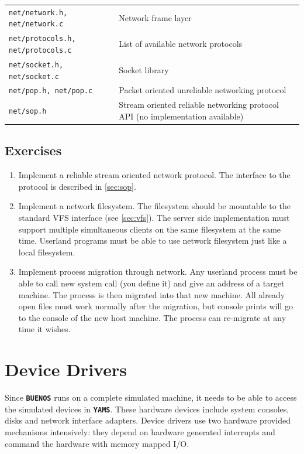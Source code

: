 \documentclass[twoside,a4paper]{report}
\newcommand{\PBS}[1]{\let\temp=\\#1\let\\=\temp}
\newlength{\tablewidth}
\newcommand{\buenos}{\texttt{\textbf{BUENOS}}}
\newcommand{\yams}{\texttt{\textbf{YAMS}}}
\newenvironment{filelist}[0]{%
\vspace{\baselineskip}%
\begin{center}%
\begin{tabular}{p{4cm}>{\PBS\raggedright}p{\tablewidth-4\tabcolsep-4cm}}%
\hline%
}{%
\end{tabular}%
\end{center}%
}
\newcommand{\file}[2]{\texttt{#1} \vspace{2mm} & #2 \vspace{2mm}\\}
\newenvironment{exercises}[1][\addcontentsline{toc}{section}{Exercises}%
\section*{Exercises}\markright{EXERCISES}]{%
#1%
\begin{enumerate}%
}{%
\end{enumerate}
}
\newcounter{exercisec}[chapter]
\newcommand{\cexercise}[1]{%
\item[\stepcounter{exercisec}{\huge\Keyboard}\hspace{5mm}\textbf{\arabic{chapter}.\theexercisec{}.}] #1%
}
\begin{document}
\begin{filelist}

\file{net/network.h, net/network.c}{Network frame layer}

\file{net/protocols.h, net/protocols.c}{List of available network protocols}

\file{net/socket.h, net/socket.c}{Socket library}

\file{net/pop.h, net/pop.c}{Packet oriented unreliable networking protocol}

\file{net/sop.h}{Stream oriented reliable networking protocol API
(no implementation available)}

\end{filelist}

\begin{exercises}

\cexercise{Implement a reliable stream oriented network protocol. The
interface to the protocol is described in \autoref{sec:sop}.}

\cexercise{Implement a network filesystem. The filesystem should be
mountable to the standard VFS interface (see \autoref{sec:vfs}). The
server side implementation must support multiple simultaneous clients
on the same filesystem at the same time. Userland programs must be
able to use network filesystem just like a local filesystem.}

\cexercise{Implement process migration through network. Any userland
process must be able to call new system call (you define it) and give
an address of a target machine. The process is then migrated into that
new machine. All already open files must work normally after the
migration, but console prints will go to the console of the new host
machine. The process can re-migrate at any time it wishes.}

\end{exercises}




\chapter{Device Drivers}
\label{sec:device}

Since \buenos{} runs on a complete simulated machine, it needs to be
able to access the simulated devices in \yams{}. These hardware
devices include system consoles, disks and network interface adapters.
Device drivers use two hardware provided mechanisms intensively: they
depend on hardware generated interrupts and command the hardware with
memory mapped I/O.
\end{document}
